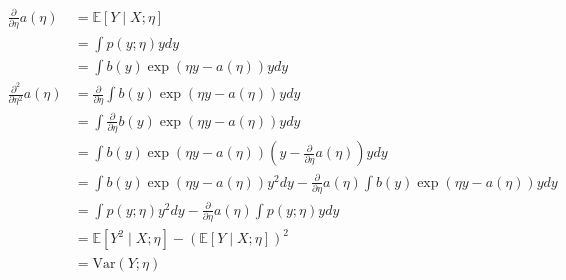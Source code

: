 \begin{answer}
    $$
    \begin{aligned}
        \frac{\partial}{\partial\eta}a(\eta) &= \mathbb{E}[Y\mid X; \eta] \\
            &= \int p(y;\eta)y dy\\
            &= \int b(y)\exp(\eta y - a(\eta))y dy\\
            \frac{\partial^2}{\partial\eta^2}a(\eta) &= \frac{\partial}{\partial\eta}\int b(y)\exp(\eta y - a(\eta))y dy\\
            &= \int \frac{\partial}{\partial\eta} b(y)\exp(\eta y - a(\eta))y dy\\
            &= \int b(y)\exp(\eta y - a(\eta))(y - \frac{\partial}{\partial\eta}a(\eta))y dy\\
            &= \int b(y)\exp(\eta y - a(\eta))y^2 dy - \frac{\partial}{\partial\eta}a(\eta)\int b(y)\exp(\eta y - a(\eta))y dy\\
            &= \int p(y;\eta)y^2 dy - \frac{\partial}{\partial\eta}a(\eta)\int  p(y;\eta)y dy\\
            &= \mathbb{E}[Y^2\mid X; \eta] - (\mathbb{E}[Y\mid X; \eta])^2\\
            &= \text{Var}(Y; \eta)
        \end{aligned}
    $$
\end{answer}
